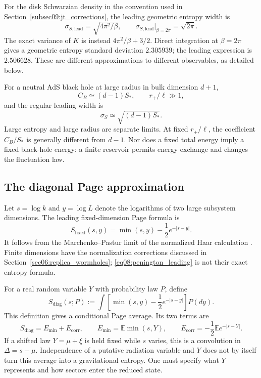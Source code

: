 \documentclass[11pt,letterpaper]{article}
\theoremstyle{plain}
\theoremstyle{definition}
\theoremstyle{remark}
\begin{document}
For the disk Schwarzian density in the convention used in
Section~\ref{subsec09:jt_corrections}, the leading geometric entropy width is
\begin{equation}
 \sigma_{S,\mathrm{lead}}=\sqrt{4\pi^2/\beta},
 \qquad \sigma_{S,\mathrm{lead}}\big|_{\beta=2\pi}=\sqrt{2\pi}.
 \label{eq08:sigma_jt}
\end{equation}
The exact variance of $K$ is instead $4\pi^2/\beta+3/2$. Direct integration
at $\beta=2\pi$ gives a geometric entropy standard deviation $2.305939$;
the leading expression is $2.506628$. These are different approximations to
different observables, as detailed below.

For a neutral AdS black hole at large radius in bulk dimension $d+1$,
\begin{equation}
 C_B\simeq(d-1)S_*,\qquad r_+/\ell\gg1,
 \label{eq08:cv_higher_dim}
\end{equation}
and the regular leading width is
\begin{equation}
 \sigma_S\simeq\sqrt{(d-1)S_*}.
 \label{eq08:sigma_higher_dim}
\end{equation}
Large entropy and large radius are separate limits. At fixed $r_+/\ell$,
the coefficient $C_B/S_*$ is generally different from $d-1$. Nor does a
fixed total energy imply a fixed black-hole energy: a finite reservoir permits
energy exchange and changes the fluctuation law.

\subsection{The diagonal Page approximation}
\label{subsec08:convolution_formula}

Let $s=\log k$ and $y=\log L$ denote the logarithms of two large subsystem
dimensions. The leading fixed-dimension Page formula is
\begin{equation}
 S_{\mathrm{fixed}}(s,y)
 =\min(s,y)-\frac12e^{-|s-y|}.
 \label{eq08:penington_leading}
\end{equation}
It follows from the Marchenko--Pastur limit of the normalized Haar calculation
\citep{page1993,pssyetal2022}. Finite dimensions have the normalization
corrections discussed in Section~\ref{sec06:replica_wormholes};
\eqref{eq08:penington_leading} is not their exact entropy formula.

For a real random variable $Y$ with probability law $P$, define
\begin{equation}
 S_{\mathrm{diag}}(s;P)
 :=\int\left[\min(s,y)-\frac12e^{-|s-y|}\right]P(dy).
 \label{eq08:convolution}
\end{equation}
This definition gives a conditional Page average. Its two terms are
\begin{equation}
 S_{\mathrm{diag}}=E_{\mathrm{min}}+E_{\mathrm{corr}},\qquad
 E_{\mathrm{min}}=\mathbb E\min(s,Y),\qquad
 E_{\mathrm{corr}}=-\frac12\mathbb E e^{-|s-Y|}.
 \label{eq08:decomposition}
\end{equation}
If a shifted law $Y=\mu+\xi$ is held fixed while $s$ varies, this is a
convolution in $\Delta=s-\mu$. Independence of a putative radiation variable
and $Y$ does not by itself turn this average into a gravitational entropy.
One must specify what $Y$ represents and how sectors enter the reduced state.
\end{document}
